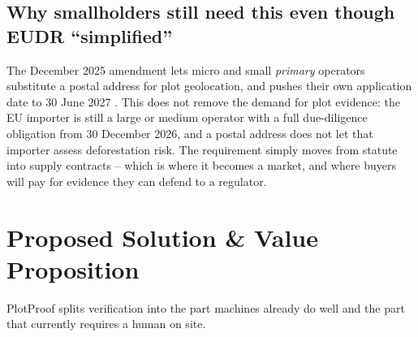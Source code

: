 \documentclass[11pt]{article}
\begin{document}
\subsection{Why smallholders still need this even though EUDR ``simplified''}
The December 2025 amendment lets micro and small \emph{primary} operators substitute a postal address for plot geolocation, and pushes their own application date to 30 June 2027 \cite{eudr-dates,eudr-text}. This does not remove the demand for plot evidence: the EU importer is still a large or medium operator with a full due-diligence obligation from 30 December 2026, and a postal address does not let that importer assess deforestation risk. The requirement simply moves from statute into supply contracts -- which is where it becomes a market, and where buyers will pay for evidence they can defend to a regulator.

\section{Proposed Solution \& Value Proposition}

PlotProof splits verification into the part machines already do well and the part that currently requires a human on site.
\end{document}
